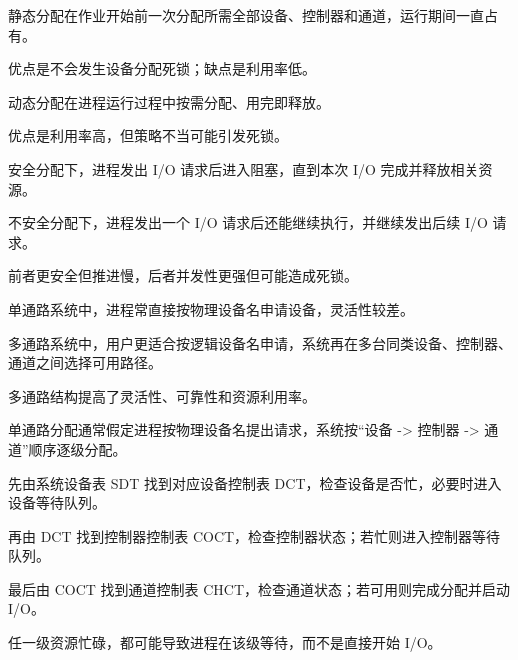\begin{points}
  \item 静态分配在作业开始前一次分配所需全部设备、控制器和通道，运行期间一直占有。
  \item 优点是不会发生设备分配死锁；缺点是利用率低。
  \item 动态分配在进程运行过程中按需分配、用完即释放。
  \item 优点是利用率高，但策略不当可能引发死锁。
\end{points}


\begin{points}
  \item 安全分配下，进程发出 I/O 请求后进入阻塞，直到本次 I/O 完成并释放相关资源。
  \item 不安全分配下，进程发出一个 I/O 请求后还能继续执行，并继续发出后续 I/O 请求。
  \item 前者更安全但推进慢，后者并发性更强但可能造成死锁。
\end{points}


\begin{points}
  \item 单通路系统中，进程常直接按物理设备名申请设备，灵活性较差。
  \item 多通路系统中，用户更适合按逻辑设备名申请，系统再在多台同类设备、控制器、通道之间选择可用路径。
  \item 多通路结构提高了灵活性、可靠性和资源利用率。
\end{points}


\begin{points}
  \item 单通路分配通常假定进程按物理设备名提出请求，系统按“设备 -> 控制器 -> 通道”顺序逐级分配。
  \item 先由系统设备表 SDT 找到对应设备控制表 DCT，检查设备是否忙，必要时进入设备等待队列。
  \item 再由 DCT 找到控制器控制表 COCT，检查控制器状态；若忙则进入控制器等待队列。
  \item 最后由 COCT 找到通道控制表 CHCT，检查通道状态；若可用则完成分配并启动 I/O。
  \item 任一级资源忙碌，都可能导致进程在该级等待，而不是直接开始 I/O。
\end{points}


